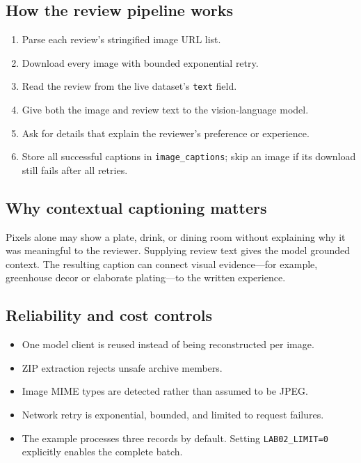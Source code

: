 \documentclass[11pt]{article}
\begin{document}
\subsection{How the review pipeline works}

\begin{enumerate}
  \item Parse each review's stringified image URL list.
  \item Download every image with bounded exponential retry.
  \item Read the review from the live dataset's \texttt{text} field.
  \item Give both the image and review text to the vision-language model.
  \item Ask for details that explain the reviewer's preference or experience.
  \item Store all successful captions in \texttt{image\_captions}; skip an
        image if its download still fails after all retries.
\end{enumerate}

\subsection{Why contextual captioning matters}

Pixels alone may show a plate, drink, or dining room without explaining why it
was meaningful to the reviewer. Supplying review text gives the model grounded
context. The resulting caption can connect visual evidence---for example,
greenhouse decor or elaborate plating---to the written experience.

\subsection{Reliability and cost controls}

\begin{itemize}
  \item One model client is reused instead of being reconstructed per image.
  \item ZIP extraction rejects unsafe archive members.
  \item Image MIME types are detected rather than assumed to be JPEG.
  \item Network retry is exponential, bounded, and limited to request failures.
  \item The example processes three records by default. Setting
        \texttt{LAB02\_LIMIT=0} explicitly enables the complete batch.
\end{itemize}
\end{document}
